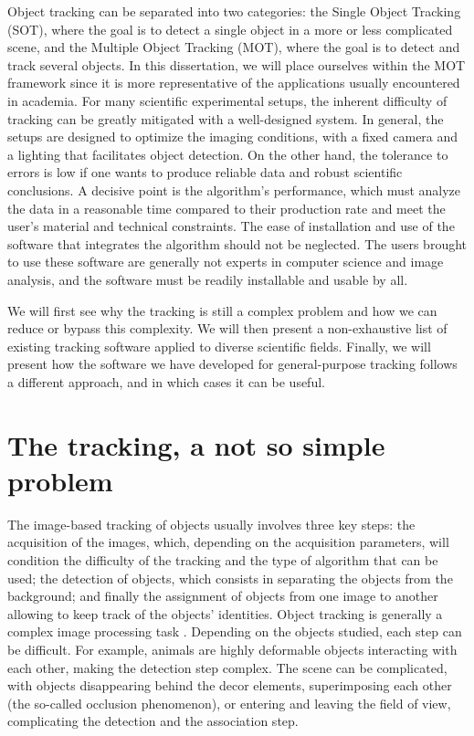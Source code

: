     Object tracking can be separated into two categories: the Single Object Tracking (SOT), where the goal is to detect a single object in a more or less complicated scene, and the Multiple Object Tracking (MOT), where the goal is to detect and track several objects. In this dissertation, we will place ourselves within the MOT framework since it is more representative of the applications usually encountered in academia. For many scientific experimental setups, the inherent difficulty of tracking can be greatly mitigated with a well-designed system. In general, the setups are designed to optimize the imaging conditions, with a fixed camera and a lighting that facilitates object detection. On the other hand, the tolerance to errors is low if one wants to produce reliable data and robust scientific conclusions. A decisive point is the algorithm's performance, which must analyze the data in a reasonable time compared to their production rate and meet the user's material and technical constraints. The ease of installation and use of the software that integrates the algorithm should not be neglected. The users brought to use these software are generally not experts in computer science and image analysis, and the software must be readily installable and usable by all.

    We will first see why the tracking is still a complex problem and how we can reduce or bypass this complexity. We will then present a non-exhaustive list of existing tracking software applied to diverse scientific fields. Finally, we will present how the software we have developed for general-purpose tracking follows a different approach, and in which cases it can be useful.

	\section{The tracking, a not so simple problem}
    The image-based tracking of objects usually involves three key steps: the acquisition of the images, which, depending on the acquisition parameters, will condition the difficulty of the tracking and the type of algorithm that can be used; the detection of objects, which consists in separating the objects from the background; and finally the assignment of objects from one image to another allowing to keep track of the objects' identities. Object tracking is generally a complex image processing task \cite{dell2014automated}. Depending on the objects studied, each step can be difficult. For example, animals are highly deformable objects interacting with each other, making the detection step complex. The scene can be complicated, with objects disappearing behind the decor elements, superimposing each other (the so-called occlusion phenomenon), or entering and leaving the field of view, complicating the detection and the association step.

